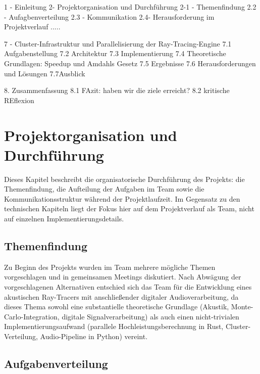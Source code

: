 1 - Einleitung
2- Projektorganisation und Durchführung
2-1 - Themenfindung
2.2 - Aufagbenverteilung
2.3 - Kommunikation
2.4- Herausforderung im Projektverlauf
.....

7 - Cluster-Infrastruktur und Parallelisierung der Ray-Tracing-Engine
7.1 Aufgabenstellung
7.2 Architektur
7.3 Implementierung
7.4 Theoretische Grundlagen: Speedup und Amdahls Gesetz
7.5 Ergebnisse
7.6 Herausforderungen und Lösungen 
7.7Ausblick

 8. Zusammenfassung
 8.1 FAzit: haben wir die ziele erreicht?
 8.2 kritische REflexion



\section{Projektorganisation und Durchführung}
\label{sec:projektorganisation}

Dieses Kapitel beschreibt die organisatorische Durchführung des Projekts:
die Themenfindung, die Aufteilung der Aufgaben im Team sowie die
Kommunikationsstruktur während der Projektlaufzeit. Im Gegensatz zu den
technischen Kapiteln liegt der Fokus hier auf dem Projektverlauf als
Team, nicht auf einzelnen Implementierungsdetails.

\subsection{Themenfindung}
\label{sec:themenfindung}

Zu Beginn des Projekts wurden im Team mehrere mögliche Themen
vorgeschlagen und in gemeinsamen Meetings diskutiert. Nach Abwägung der vorgeschlagenen Alternativen entschied sich das Team für die Entwicklung eines akustischen Ray-Tracers mit anschließender digitaler Audioverarbeitung, da dieses Thema sowohl eine substantielle theoretische Grundlage (Akustik, Monte-Carlo-Integration,
digitale Signalverarbeitung) als auch einen nicht-trivialen
Implementierungsaufwand (parallele Hochleistungsberechnung in Rust,
Cluster-Verteilung, Audio-Pipeline in Python) vereint.

\subsection{Aufgabenverteilung}
\label{sec:aufgabenverteilung}

